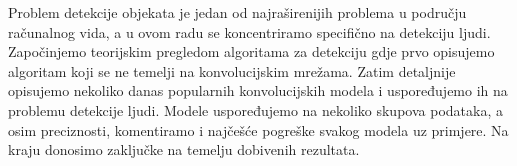 \begin{sazetak}

Problem detekcije objekata je jedan od najraširenijih problema u području računalnog vida, a u ovom radu se koncentriramo specifično na detekciju ljudi. Započinjemo teorijskim pregledom algoritama za detekciju gdje prvo opisujemo algoritam koji se ne temelji na konvolucijskim mrežama. Zatim detaljnije opisujemo nekoliko danas popularnih konvolucijskih modela i uspoređujemo ih na problemu detekcije ljudi. Modele uspoređujemo na nekoliko skupova podataka, a osim preciznosti, komentiramo i najčešće pogreške svakog modela uz primjere. Na kraju donosimo zaključke na temelju dobivenih rezultata.

\end{sazetak}